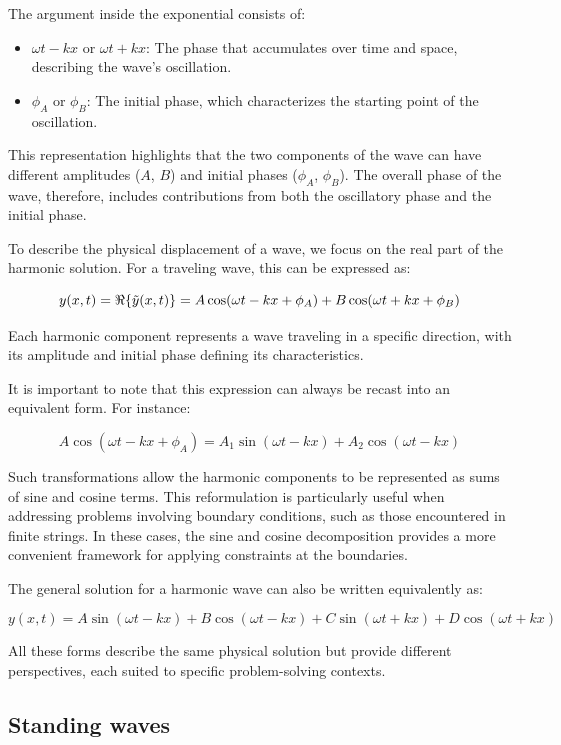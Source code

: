 \documentclass[a4paper]{article}
\begin{document}
The argument inside the exponential consists of:
\begin{itemize}
\item \(\omega t - kx\) or \(\omega t + kx\): The phase that accumulates over time and space, describing the wave's oscillation.
\item \(\phi_A\) or \(\phi_B\): The initial phase, which characterizes the starting point of the oscillation.
\end{itemize}


This representation highlights that the two components of the wave can have different amplitudes (\(A\), \(B\)) and initial phases (\(\phi_A\), \(\phi_B\)). The overall phase of the wave, therefore, includes contributions from both the oscillatory phase and the initial phase.

To describe the physical displacement of a wave, we focus on the real part of the harmonic solution. For a traveling wave, this can be expressed as:

\[
y(x, t) = \Re\{\Tilde{y}(x, t)\} = A \cos(\omega t - kx + \phi_A) + B \cos(\omega t + kx + \phi_B)
\]

Each harmonic component represents a wave traveling in a specific direction, with its amplitude and initial phase defining its characteristics.

It is important to note that this expression can always be recast into an equivalent form. For instance:

\[
A \cos(\omega t - kx + \phi_A) = A_1 \sin(\omega t - kx) + A_2 \cos(\omega t - kx)
\]

Such transformations allow the harmonic components to be represented as sums of sine and cosine terms. This reformulation is particularly useful when addressing problems involving boundary conditions, such as those encountered in finite strings. In these cases, the sine and cosine decomposition provides a more convenient framework for applying constraints at the boundaries.

The general solution for a harmonic wave can also be written equivalently as:

\[
y(x, t) = A \sin(\omega t - kx) + B \cos(\omega t - kx) + C \sin(\omega t + kx) + D \cos(\omega t + kx)
\]

All these forms describe the same physical solution but provide different perspectives, each suited to specific problem-solving contexts.\\

\subsection{Standing waves}
\end{document}

